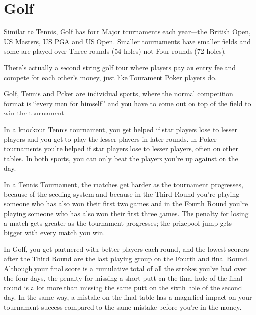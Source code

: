\section{Golf}

Similar to Tennis, Golf has four Major tournaments each
year---the British Open, US Masters, US PGA and US Open. Smaller
tournaments have smaller fields and some are played over
Three rounds (54 holes) not Four rounds (72 holes).

There's actually a second string golf tour where players pay an
entry fee and compete for each other's money, just like
Tourament Poker players do.

Golf, Tennis and Poker are individual sports, where
the normal competition format is ``every man for himself'' and
you have to come out on top of the field to win the tournament.

In a knockout Tennis tournament, you get helped
if star players lose to lesser players and you get to play the
lesser players in later rounds. In Poker tournaments you're
helped if star players lose to lesser players, often on other
tables. In both sports, you can only beat the players you're
up against on the day.

In a Tennis Tournament, the matches get harder as the tournament
progresses, because of the seeding system and because in the Third
Round you're playing someone who has also won their first two games
and in  the Fourth Round you're playing someone who has also won their
first three games. The penalty for losing a match gets greater as the
tournament progresses; the prizepool jump gets bigger with every match
you win.

In Golf, you get partnered with better players each round, and the
lowest scorers after the Third Round are the last playing group on the
Fourth and final Round. Although your final score is a cumulative
total of all the strokes you've had over the four days, the penalty
for missing a short putt on the final hole of the final round is a lot
more than missing the same putt on the sixth hole of the second day.
In the same way, a mistake on the final table has a magnified impact
on your tournament success compared to the same mistake before you're
in the money.
